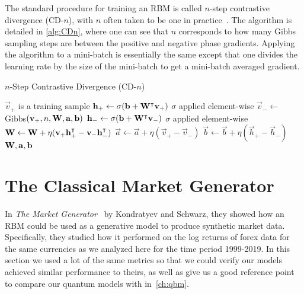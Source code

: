 The standard procedure for training an RBM is called \( n \)-step contrastive divergence (CD-\( n \)), with \( n \) often taken to be one in practice~\cite{hinton_rbm_training}.
The algorithm is detailed in \cref{alg:CDn}, where one can see that \( n \) corresponds to how many Gibbs sampling steps are between the positive and negative phase gradients.
Applying the algorithm to a mini-batch is essentially the same except that one divides the learning rate by the size of the mini-batch to get a mini-batch averaged gradient.

\begin{algorithm}
\caption{$n$-Step Contrastive Divergence (CD-$n$)}
\begin{algorithmic}[1]
        \Comment $\vec{v}_+$ is a training sample
        \State $\mathbf{h}_+ \gets \sigma(\mathbf{b} + \mathbf{W}^\intercal\mathbf{v}_+)$
            \Comment $\sigma$ applied element-wise
        \State $\vec{v}_- \gets$ Gibbs$(\mathbf{v}_+,n,\mathbf{W},\mathbf{a},\mathbf{b})$
        \State $\mathbf{h}_- \gets \sigma(\mathbf{b} + \mathbf{W}^\intercal\mathbf{v}_-)$
            \Comment $\sigma$ applied element-wise
        \State $\mathbf{W} \gets \mathbf{W} + \eta(\mathbf{v}_+ \mathbf{h}_+^\intercal - \mathbf{v}_- \mathbf{h}_-^\intercal)$
        \State $\vec{a} \gets \vec{a} + \eta(\vec{v}_+ - \vec{v}_-)$
        \State $\vec{b} \gets \vec{b} + \eta(\vec{h}_+ - \vec{h}_-)$
        \State \Return $\mathbf{W}, \mathbf{a}, \mathbf{b}$
    \EndProcedure
\end{algorithmic}
\label{alg:CDn}
\end{algorithm}


\section{The Classical Market Generator}\label{sec:classical_market_generator}
In \textit{The Market Generator}~\cite{kondratyev_2019} by Kondratyev and Schwarz, they showed how an RBM could be used as a generative model to produce synthetic market data.
Specifically, they studied how it performed on the log returns of forex data for the same currencies as we analyzed here for the time period 1999-2019.
In this section we used a lot of the same metrics so that we could verify our models achieved similar performance to theirs, as well as give us a good reference point to compare our quantum models with in~\cref{ch:qbm}.

